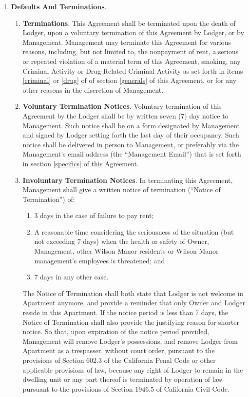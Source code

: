 \documentclass[12pt,letterpaper]{article}
\newcommand{\lodger}{Lodger}
\newcommand{\management}{Management}
\newcommand{\myemail}{Management Email}
\newcommand{\condo}{Wilson Manor}
\newcommand{\apt}{Apartment}
\begin{document}
\begin{enumerate}
	\item \textbf{Defaults And Terminations}. 
		\begin{enumerate}
			\item \textbf{Terminations}. 
				This Agreement shall be terminated upon the death of \lodger{}, upon a voluntary termination of this Agreement by \lodger{}, or by \management{}. \management{} may terminate this Agreement for various reasons, including, but not limited to, the nonpayment of rent, a serious or repeated violation of a material term of this Agreement, smoking, any Criminal Activity or Drug-Related Criminal Activity as set forth in items \ref{criminal} or \ref{drug} of of section \ref{generals} of this Agreement, or for any other reasons in the discretion of \management{}.
			\item \textbf{Voluntary Termination Notices}. 
				Voluntary termination of this Agreement by the \lodger{} shall be by written seven (7) day notice to \management{}. Such notice shall be on a form designated by \management{} and signed by \lodger{} setting forth the last day of their occupancy. Such notice shall be delivered in person to \management{}, or preferably via the \management{}'s email address (the ``\myemail{}'') that is set forth in section \ref{specifics} of this Agreement{}. 
			\item \textbf{Involuntary Termination Notices}. \label{terminate}
				In terminating this Agreement, \management{} shall give a written notice of termination (``Notice of Termination'') of: 
				\begin{enumerate}
					\item 3 days in the case of failure to pay rent; 
					\item A reasonable time considering the seriousness of the situation (but not exceeding 7 days) when the health or safety of Owner, \management{}, other \condo{} residents or \condo{} management's employees is threatened; and 
					\item 7 days in any other case. 
				\end{enumerate} 
				The Notice of Termination shall both state that \lodger{} is not welcome in \apt{} anymore, and provide a reminder that only Owner and \lodger{} reside in this \apt{}. If the notice period is less than 7 days, the Notice of Termination shall also provide the justifying reason for shorter notice. So that, upon expiration of the notice period provided, \management{} will remove \lodger{}'s possessions, and remove \lodger{} from \apt{} as a trespasser, without court order, pursuant to the provisions of Section 602.3 of the California Penal Code or other applicable provisions of law, because any right of \lodger{} to remain in the dwelling unit or any part thereof is terminated by operation of law pursuant to the provisions of Section 1946.5 of California Civil Code.

\end{enumerate}
\end{enumerate}
\end{document}
